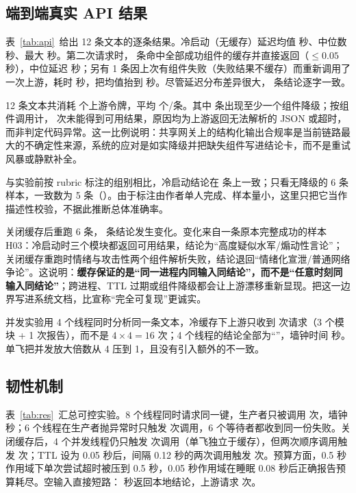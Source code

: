 \documentclass[12pt,a4paper,fontset=windows]{ctexart}
\begin{document}
\subsection{端到端真实 API 结果}

表~\ref{tab:api}~给出 12 条文本的逐条结果。冷启动（无缓存）延迟均值 \ApiColdMean{} 秒、中位数 \ApiColdMedian{} 秒、最大 \ApiColdMax{} 秒。第二次请求时，\ApiFastWarm{} 条命中全部成功组件的缓存并直接返回（$\le 0.05$ 秒），中位延迟 \ApiWarmMedian{} 秒；另有 1 条因上次有组件失败（失败结果不缓存）而重新调用了一次上游，耗时 \ApiWarmMax{} 秒，把均值抬到 \ApiWarmMean{} 秒。尽管延迟分布差异很大，\ApiIdentical{} 条结论逐字一致。

12 条文本共消耗 \ApiTokens{} 个上游令牌，平均 \ApiTokPerItem{} 个/条。其中 \ApiDegraded{} 条出现至少一个组件降级；按组件调用计，\ApiCompFail{} 次未能得到可用结果，原因均为上游返回无法解析的 JSON 或超时，而非判定代码异常。这一比例说明：共享网关上的结构化输出合规率是当前链路最大的不确定性来源，系统的应对是如实降级并把缺失组件写进结论卡，而不是重试风暴或静默补全。

与实验前按 rubric 标注的组别相比，冷启动结论在 \ApiAgree{} 条上一致；只看无降级的 6 条样本，一致数为 5 条（\ApiAgreeClean{}）。由于标注由作者单人完成、样本量小，这里只把它当作描述性校验，不据此推断总体准确率。

关闭缓存后重跑 6 条，\ApiDrift{} 条结论发生变化。变化来自一条原本完整成功的样本 H03：冷启动时三个模块都返回可用结果，结论为“高度疑似水军/煽动性言论”；关闭缓存重跑时情绪与攻击性两个组件解析失败，结论退回“情绪化宣泄/普通网络争论”。这说明：\textbf{缓存保证的是“同一进程内同输入同结论”，而不是“任意时刻同输入同结论”}；跨进程、TTL 过期或组件降级都会让上游漂移重新显现。把这一边界写进系统文档，比宣称“完全可复现”更诚实。

并发实验用 4 个线程同时分析同一条文本，冷缓存下上游只收到 \ApiConcRequests{} 次请求（3 个模块 + 1 次报告），而不是 $4\times4=16$ 次；4 个线程的结论全部为“\ApiConcConclusion”，墙钟时间 \ApiConcWall{} 秒。单飞把并发放大倍数从 4 压到 1，且没有引入额外的不一致。



\subsection{韧性机制}

表~\ref{tab:res}~汇总可控实验。8 个线程同时请求同一键，生产者只被调用 \SfCalls{} 次，墙钟 \SfWall{} 秒；6 个线程在生产者抛异常时只触发 \FailCalls{} 次调用，6 个等待者都收到同一份失败。关闭缓存后，4 个并发线程仍只触发 \CacheOffCalls{} 次调用（单飞独立于缓存），但两次顺序调用触发 \CacheOffSeq{} 次；TTL 设为 0.05 秒后，间隔 0.12 秒的两次调用触发 \TtlCalls{} 次。预算方面，0.5 秒作用域下单次尝试超时被压到 0.5 秒，0.05 秒作用域在睡眠 0.08 秒后正确报告预算耗尽。空输入直接短路：\EmptyLatency{} 秒返回本地结论，上游请求 \EmptyCalls{} 次。
\end{document}
